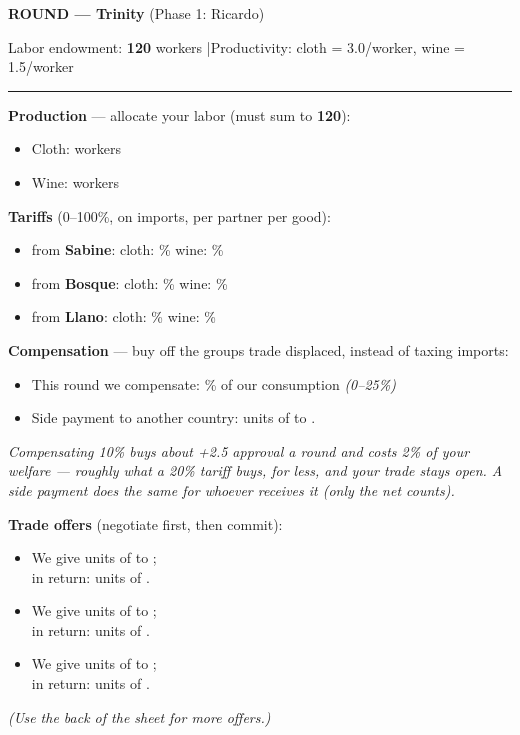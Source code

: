 \documentclass[11pt]{article}
\newcommand{\blank}[1]{\underline{\hspace{#1}}}
\newcommand{\hr}{\par\vspace{2pt}\noindent\rule{\linewidth}{0.4pt}\par\vspace{2pt}}
\begin{document}
\newpage

{\large\bfseries ROUND \blank{1cm} --- Trinity} \hfill (Phase 1: Ricardo)\par
Labor endowment: \textbf{120} workers \quad|\quad Productivity: cloth = 3.0/worker, wine = 1.5/worker
\hr

{\bfseries Production} --- allocate your labor (must sum to \textbf{120}):\par
\begin{itemize}[nosep,leftmargin=1.4em]
  \item Cloth: \blank{2.5cm} workers
  \item Wine: \blank{2.5cm} workers
\end{itemize}

\vspace{4pt}
{\bfseries Tariffs} (0--100\%, on imports, per partner per good):\par
\begin{itemize}[nosep,leftmargin=1.4em]
  \item from \textbf{Sabine}: \quad cloth: \blank{1.4cm}\% \quad wine: \blank{1.4cm}\%
  \item from \textbf{Bosque}: \quad cloth: \blank{1.4cm}\% \quad wine: \blank{1.4cm}\%
  \item from \textbf{Llano}: \quad cloth: \blank{1.4cm}\% \quad wine: \blank{1.4cm}\%
\end{itemize}

\vspace{4pt}
{\bfseries Compensation} --- buy off the groups trade displaced, instead of taxing imports:\par
\begin{itemize}[nosep,leftmargin=1.4em]
  \item This round we compensate: \blank{1.4cm}\% of our consumption \quad \textit{(0--25\%)}
  \item Side payment to another country: \blank{1.6cm} units of \blank{2cm} to \blank{2.2cm}.
\end{itemize}
\textit{Compensating 10\% buys about +2.5 approval a round and costs 2\% of your welfare --- roughly what a 20\% tariff buys, for less, and your trade stays open. A side payment does the same for whoever receives it (only the net counts).}

\vspace{4pt}
{\bfseries Trade offers} (negotiate first, then commit):\par
\begin{itemize}[itemsep=4pt,leftmargin=1.4em]
  \item We give \blank{1.8cm} units of \blank{2.2cm} to \blank{2.2cm};\\[2pt] in return: \blank{1.8cm} units of \blank{2.2cm}.
  \item We give \blank{1.8cm} units of \blank{2.2cm} to \blank{2.2cm};\\[2pt] in return: \blank{1.8cm} units of \blank{2.2cm}.
  \item We give \blank{1.8cm} units of \blank{2.2cm} to \blank{2.2cm};\\[2pt] in return: \blank{1.8cm} units of \blank{2.2cm}.
\end{itemize}
\textit{(Use the back of the sheet for more offers.)}
\end{document}
